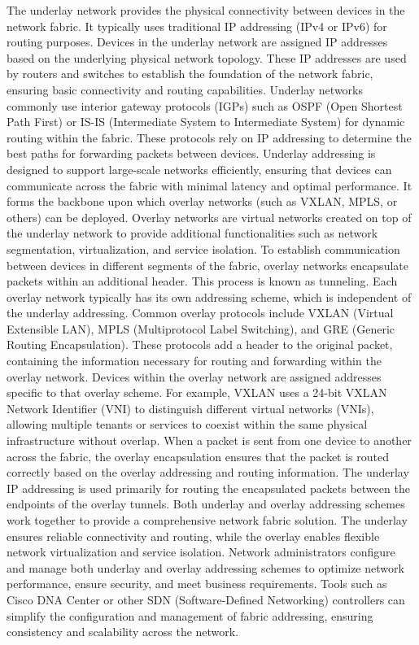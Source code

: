 \documentclass{article}
\begin{document}
	The underlay network provides the physical connectivity between devices in the network fabric. It typically uses traditional IP addressing (IPv4 or IPv6) for routing purposes. Devices in the underlay network are assigned IP addresses based on the underlying physical network topology. These IP addresses are used by routers and switches to establish the foundation of the network fabric, ensuring basic connectivity and routing capabilities. Underlay networks commonly use interior gateway protocols (IGPs) such as OSPF (Open Shortest Path First) or IS-IS (Intermediate System to Intermediate System) for dynamic routing within the fabric. These protocols rely on IP addressing to determine the best paths for forwarding packets between devices. Underlay addressing is designed to support large-scale networks efficiently, ensuring that devices can communicate across the fabric with minimal latency and optimal performance. It forms the backbone upon which overlay networks (such as VXLAN, MPLS, or others) can be deployed. Overlay networks are virtual networks created on top of the underlay network to provide additional functionalities such as network segmentation, virtualization, and service isolation. To establish communication between devices in different segments of the fabric, overlay networks encapsulate packets within an additional header. This process is known as tunneling. Each overlay network typically has its own addressing scheme, which is independent of the underlay addressing. Common overlay protocols include VXLAN (Virtual Extensible LAN), MPLS (Multiprotocol Label Switching), and GRE (Generic Routing Encapsulation). These protocols add a header to the original packet, containing the information necessary for routing and forwarding within the overlay network. Devices within the overlay network are assigned addresses specific to that overlay scheme. For example, VXLAN uses a 24-bit VXLAN Network Identifier (VNI) to distinguish different virtual networks (VNIs), allowing multiple tenants or services to coexist within the same physical infrastructure without overlap. When a packet is sent from one device to another across the fabric, the overlay encapsulation ensures that the packet is routed correctly based on the overlay addressing and routing information. The underlay IP addressing is used primarily for routing the encapsulated packets between the endpoints of the overlay tunnels. Both underlay and overlay addressing schemes work together to provide a comprehensive network fabric solution. The underlay ensures reliable connectivity and routing, while the overlay enables flexible network virtualization and service isolation. Network administrators configure and manage both underlay and overlay addressing schemes to optimize network performance, ensure security, and meet business requirements. Tools such as Cisco DNA Center or other SDN (Software-Defined Networking) controllers can simplify the configuration and management of fabric addressing, ensuring consistency and scalability across the network.\\
  
\end{document}
